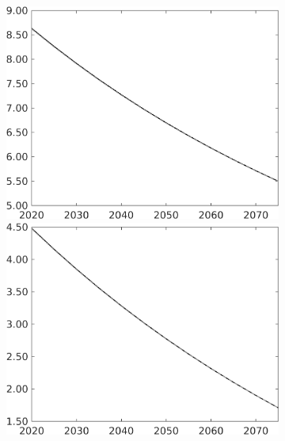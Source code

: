 \begin{figure}[h!!]
\begin{subfigure}{0.75\textwidth}
\begin{minipage}[]{0.32\textwidth}
\end{minipage}
\begin{minipage}[]{0.32\textwidth}
\includegraphics[width=1\textwidth]{../../codding_model/own_basedOnFried/optimalPol_010922_revision/figures/all_13Sept22/PerdifNoTauf_regime5_CompTaul_snS_spillover0_nsk0_xgr0_knspil1_sep0_LFlimit0_emsbase0_countec0_GovRev0_etaa0.79_lgd0.png}
\end{minipage}
\begin{minipage}[]{0.32\textwidth}
\includegraphics[width=1\textwidth]{../../codding_model/own_basedOnFried/optimalPol_010922_revision/figures/all_13Sept22/PerdifNoTauf_regime5_CompTaul_sn_spillover0_nsk0_xgr0_knspil1_sep0_LFlimit0_emsbase0_countec0_GovRev0_etaa0.79_lgd0.png}
\end{minipage}
	\end{subfigure}
		

\end{figure}
